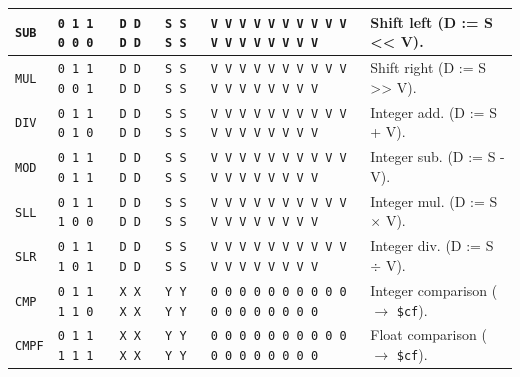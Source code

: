 \documentclass{report}
\begin{document}
{\begin{center}
\begin{tabular}[ht]{
	| p{} | p{} | p{} | p{}
	| p{} | p{} |
}
	\texttt{SUB} & \texttt{0 1 1 0 0 0} & \texttt{D D D D} & \texttt{S S S S} &
		\texttt{V V V V V V V V V V V V V V V V V V} & Shift left (D := S << V). \\
	\hline
	
	\texttt{MUL} & \texttt{0 1 1 0 0 1} & \texttt{D D D D} & \texttt{S S S S} &
		\texttt{V V V V V V V V V V V V V V V V V V} & Shift right (D := S >> V). \\
	\hline
	
	\texttt{DIV} & \texttt{0 1 1 0 1 0} & \texttt{D D D D} & \texttt{S S S S} &
		\texttt{V V V V V V V V V V V V V V V V V V} & Integer add. (D := S + V). \\
	\hline
	
	\texttt{MOD} & \texttt{0 1 1 0 1 1} & \texttt{D D D D} & \texttt{S S S S} &
		\texttt{V V V V V V V V V V V V V V V V V V} & Integer sub. (D := S - V). \\
	\hline
	
	\texttt{SLL} & \texttt{0 1 1 1 0 0} & \texttt{D D D D} & \texttt{S S S S} &
		\texttt{V V V V V V V V V V V V V V V V V V} & Integer mul. (D := S $\times$ V). \\
	\hline
	
	\texttt{SLR} & \texttt{0 1 1 1 0 1} & \texttt{D D D D} & \texttt{S S S S} &
		\texttt{V V V V V V V V V V V V V V V V V V} & Integer div. (D := S $\div$ V). \\
	\hline
	
	\texttt{CMP} & \texttt{0 1 1 1 1 0} & \texttt{X X X X} & \texttt{Y Y Y Y} &
		\texttt{0 0 0 0 0 0 0 0 0 0 0 0 0 0 0 0 0 0} & Integer comparison ($\rightarrow$ \texttt{\$cf}). \\
	\hline
	
	\texttt{CMPF} & \texttt{0 1 1 1 1 1} & \texttt{X X X X} & \texttt{Y Y Y Y} &
		\texttt{0 0 0 0 0 0 0 0 0 0 0 0 0 0 0 0 0 0} & Float comparison ($\rightarrow$ \texttt{\$cf}). \\
	\hline
\end{tabular}
\end{center}
}
\end{document}
